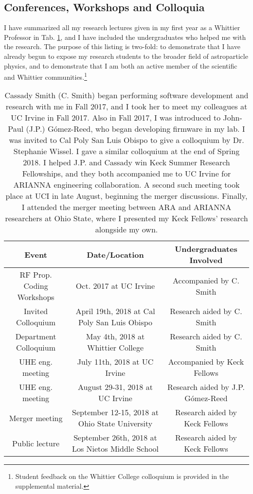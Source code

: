 \documentclass[../../main.tex]{subfiles}
\begin{document}
\subsection{Conferences, Workshops and Colloquia}

I have summarized all my research lectures given in my first year as a Whittier Professor in Tab. \ref{tab:conf}, and I have included the undergraduates who helped me with the research.  The purpose of this listing is two-fold: to demonstrate that I have already begun to expose my research students to the broader field of astroparticle physics, and to demonstrate that I am both an active member of the scientific and Whittier communities.\footnote{Student feedback on the Whittier College colloquium is provided in the supplemental material.}

\begin{table}
\small
\centering
\begin{tabular}{|c|c|c|}
\hline \hline
Event & Date/Location & Undergraduates Involved \\ \hline
RF Prop. Coding Workshops & Oct. 2017 at UC Irvine & Accompanied by C. Smith \\ \hline
Invited Colloquium & April 19th, 2018 at Cal Poly San Luis Obispo & Research aided by C. Smith \\ \hline
Department Colloquium & May 4th, 2018 at Whittier College & Research aided by C. Smith \\ \hline
UHE eng. meeting & July 11th, 2018 at UC Irvine & Accompanied by Keck Fellows \\ \hline
UHE eng. meeting & August 29-31, 2018 at UC Irvine & Research aided by J.P. G\'{o}mez-Reed \\ \hline
Merger meeting & September 12-15, 2018 at Ohio State University & Research aided by Keck Fellows \\ \hline
Public lecture & September 26th, 2018 at Los Nietos Middle School & Research aided by Keck Fellows \\ \hline
\hline
\end{tabular}
\caption{\label{tab:conf} Cassady Smith (C. Smith) began performing software development and research with me in Fall 2017, and I took her to meet my colleagues at UC Irvine in Fall 2017. Also in Fall 2017, I was introduced to John-Paul (J.P.) G\'{o}mez-Reed, who began developing firmware in my lab.  I was invited to Cal Poly San Luis Obispo to give a colloquium by Dr. Stephanie Wissel.  I gave a similar colloquium at the end of Spring 2018.  I helped J.P. and Cassady win Keck Summer Research Fellowships, and they both accompanied me to UC Irvine for ARIANNA engineering collaboration.  A second such meeting took place at UCI in late August, beginning the merger discussions.  Finally, I attended the merger meeting between ARA and ARIANNA researchers at Ohio State, where I presented my Keck Fellows' research alongside my own.}
\end{table}
\end{document}
